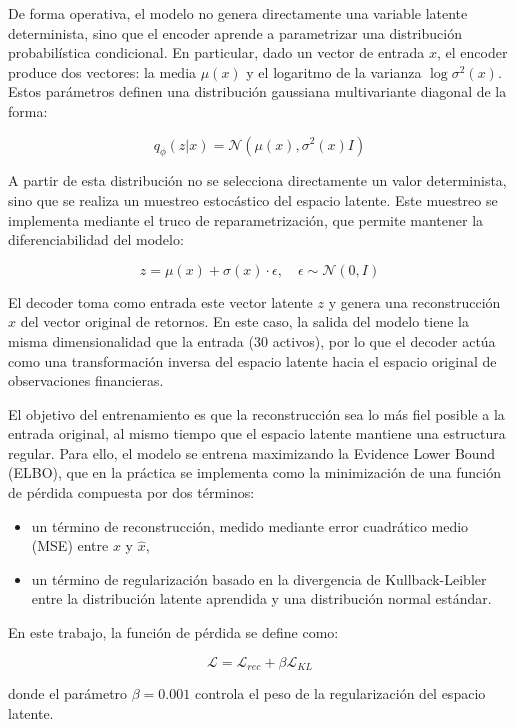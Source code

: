 De forma operativa, el modelo no genera directamente una variable latente determinista, sino que el encoder aprende a parametrizar una distribución probabilística condicional. En particular, dado un vector de entrada \(x\), el encoder produce dos vectores: la media \(\mu(x)\) y el logaritmo de la varianza \(\log \sigma^2(x)\). Estos parámetros definen una distribución gaussiana multivariante diagonal de la forma:

\[
q_\phi(z|x) = \mathcal{N}(\mu(x), \sigma^2(x) I)
\]

A partir de esta distribución no se selecciona directamente un valor determinista, sino que se realiza un muestreo estocástico del espacio latente. Este muestreo se implementa mediante el truco de reparametrización, que permite mantener la diferenciabilidad del modelo:

\[
z = \mu(x) + \sigma(x) \cdot \epsilon, \quad \epsilon \sim \mathcal{N}(0, I)
\]

El decoder toma como entrada este vector latente \(z\) y genera una reconstrucción \(\hat{x}\) del vector original de retornos. En este caso, la salida del modelo tiene la misma dimensionalidad que la entrada (30 activos), por lo que el decoder actúa como una transformación inversa del espacio latente hacia el espacio original de observaciones financieras.

El objetivo del entrenamiento es que la reconstrucción sea lo más fiel posible a la entrada original, al mismo tiempo que el espacio latente mantiene una estructura regular. Para ello, el modelo se entrena maximizando la Evidence Lower Bound (ELBO), que en la práctica se implementa como la minimización de una función de pérdida compuesta por dos términos:

\begin{itemize}
\item un término de reconstrucción, medido mediante error cuadrático medio (MSE) entre \(x\) y \(\hat{x}\),
\item un término de regularización basado en la divergencia de Kullback-Leibler entre la distribución latente aprendida y una distribución normal estándar.
\end{itemize}

En este trabajo, la función de pérdida se define como:

\[
\mathcal{L} = \mathcal{L}_{rec} + \beta \mathcal{L}_{KL}
\]

donde el parámetro \(\beta = 0.001\) controla el peso de la regularización del espacio latente.

